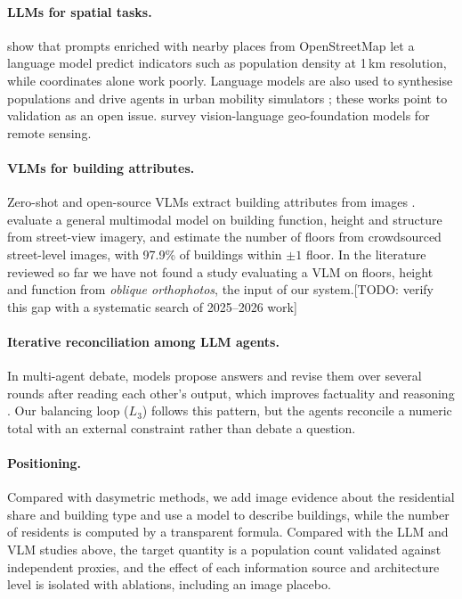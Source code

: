 \documentclass[11pt]{article}
\newcommand{\todo}[1]{{\color{red}[TODO: #1]}}
\begin{document}
\paragraph{LLMs for spatial tasks.}
\citet{manvi2024geollm} show that prompts enriched with nearby places from OpenStreetMap let a language model predict indicators such as population density at 1\,km resolution, while coordinates alone work poorly.
Language models are also used to synthesise populations and drive agents in urban mobility simulators \citep{mobiverse2025,gatsim2025,song2025llmmobility}; these works point to validation as an open issue.
\citet{zhou2024vlgfm} survey vision-language geo-foundation models for remote sensing.

\paragraph{VLMs for building attributes.}
Zero-shot and open-source VLMs extract building attributes from images \citep{pan2023zeroshot,openfacades2025}.
\citet{yang2024streetview} evaluate a general multimodal model on building function, height and structure from street-view imagery, and \citet{sun2025floors} estimate the number of floors from crowdsourced street-level images, with 97.9\% of buildings within $\pm 1$ floor.
In the literature reviewed so far we have not found a study evaluating a VLM on floors, height and function from \emph{oblique orthophotos}, the input of our system.\todo{verify this gap with a systematic search of 2025--2026 work}

\paragraph{Iterative reconciliation among LLM agents.}
In multi-agent debate, models propose answers and revise them over several rounds after reading each other's output, which improves factuality and reasoning \citep{du2024debate}.
Our balancing loop ($L_3$) follows this pattern, but the agents reconcile a numeric total with an external constraint rather than debate a question.

\paragraph{Positioning.}
Compared with dasymetric methods, we add image evidence about the residential share and building type and use a model to describe buildings, while the number of residents is computed by a transparent formula.
Compared with the LLM and VLM studies above, the target quantity is a population count validated against independent proxies, and the effect of each information source and architecture level is isolated with ablations, including an image placebo.


\end{document}
